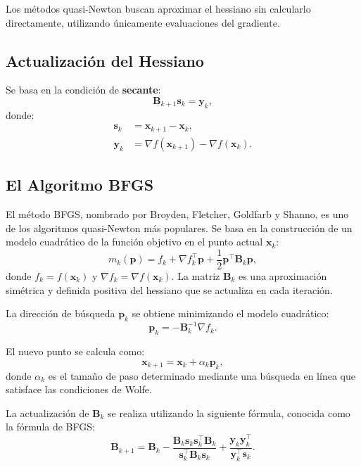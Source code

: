 Los métodos quasi-Newton buscan aproximar el hessiano sin calcularlo directamente, utilizando únicamente evaluaciones del gradiente.

\subsection{Actualización del Hessiano}

Se basa en la condición de \textbf{secante}:
\begin{equation}
\label{eq:secante}
\mathbf{B}_{k+1} \mathbf{s}_k = \mathbf{y}_k,
\end{equation}
donde:
\begin{align}
\mathbf{s}_k &= \mathbf{x}_{k+1} - \mathbf{x}_k, \\
\mathbf{y}_k &= \nabla f(\mathbf{x}_{k+1}) - \nabla f(\mathbf{x}_k).
\end{align}

\subsection{El Algoritmo BFGS}

El método BFGS, nombrado por Broyden, Fletcher, Goldfarb y Shanno, es uno de los algoritmos quasi-Newton más populares. Se basa en la construcción de un modelo cuadrático de la función objetivo en el punto actual $\mathbf{x}_k$:
\begin{equation}
m_k(\mathbf{p}) = f_k + \nabla f_k^\top \mathbf{p} + \frac{1}{2} \mathbf{p}^\top \mathbf{B}_k \mathbf{p},
\end{equation}
donde $f_k = f(\mathbf{x}_k)$ y $\nabla f_k = \nabla f(\mathbf{x}_k)$. La matriz $\mathbf{B}_k$ es una aproximación simétrica y definida positiva del hessiano que se actualiza en cada iteración.

La dirección de búsqueda $\mathbf{p}_k$ se obtiene minimizando el modelo cuadrático:
\begin{equation}
\mathbf{p}_k = -\mathbf{B}_k^{-1} \nabla f_k.
\end{equation}

El nuevo punto se calcula como:
\begin{equation}
\mathbf{x}_{k+1} = \mathbf{x}_k + \alpha_k \mathbf{p}_k,
\end{equation}
donde $\alpha_k$ es el tamaño de paso determinado mediante una búsqueda en línea que satisface las condiciones de Wolfe.

La actualización de $\mathbf{B}_k$ se realiza utilizando la siguiente fórmula, conocida como la fórmula de BFGS:
\begin{equation}
\mathbf{B}_{k+1} = \mathbf{B}_k - \frac{\mathbf{B}_k \mathbf{s}_k \mathbf{s}_k^\top \mathbf{B}_k}{\mathbf{s}_k^\top \mathbf{B}_k \mathbf{s}_k} + \frac{\mathbf{y}_k \mathbf{y}_k^\top}{\mathbf{y}_k^\top \mathbf{s}_k}.
\end{equation}

